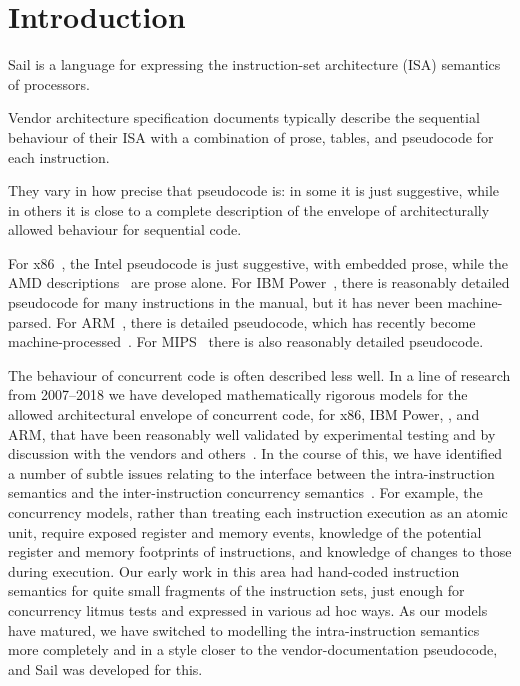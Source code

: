 \section{Introduction}
\label{sec:intro}

Sail is a language for expressing the instruction-set
architecture (ISA) semantics of processors.

Vendor architecture specification documents typically describe the
sequential behaviour of their ISA with a combination of prose, tables,
and pseudocode for each instruction.

They vary in how precise that pseudocode is: in some it is just
suggestive, while in others it is close to a complete description of
the envelope of architecturally allowed behaviour for sequential code.

For x86~\cite{Intel61}, the Intel pseudocode is just suggestive, with
embedded prose, while the AMD descriptions~\cite{AMD_3_21} are prose
alone.  For IBM Power~\cite{Power2.06}, there is reasonably detailed
pseudocode for many instructions in the manual, but it has never been
machine-parsed.  For ARM~\cite{armarmv8}, there is detailed
pseudocode, which has recently become machine-processed~\cite{Reid16}.
For MIPS~\cite{MIPS64-II,MIPS64-III} there is also reasonably detailed
pseudocode.

The behaviour of concurrent code is often described less well.  In a
line of research from 2007--2018 we have developed mathematically
rigorous models for the allowed architectural envelope of concurrent
code, for x86, IBM Power, \riscv, and ARM, that have been reasonably
well validated by experimental testing and by discussion with the
vendors and
others~\cite{x86popl,tphols09,cacm,CAV2010,Alglave:2011:LRT:1987389.1987395,pldi105,pldi2012,micro2015,FGP16,mixed17}.
In the course of this, we have identified a number of subtle issues
relating to the interface between the intra-instruction semantics and
the inter-instruction concurrency
semantics~\cite{pldi105,pldi2012,micro2015,FGP16,mixed17}. For
example, the concurrency models, rather than treating each instruction
execution as an atomic unit, require exposed register and memory
events, knowledge of the potential register and memory footprints of
instructions, and knowledge of changes to those during execution.  Our
early work in this area had hand-coded instruction semantics for quite
small fragments of the instruction sets, just enough for concurrency
litmus tests and expressed in various ad hoc ways. As our models have
matured, we have switched to modelling the intra-instruction semantics
more completely and in a style closer to the vendor-documentation
pseudocode, and Sail was developed for this.


